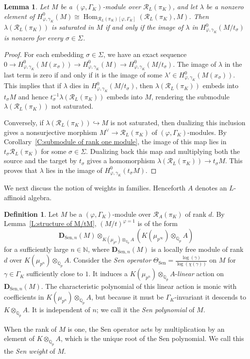 \documentclass[12pt]{article}
\newtheorem{lemma}[theorem]{Lemma}
\theoremstyle{definition}
\newtheorem{defn}[theorem]{Definition}
\numberwithin{equation}{theorem}
\newcommand{\calR}{\mathcal{R}}
\newcommand{\QQ}{\mathbb{Q}}
\newcommand{\NN}{\mathbb{N}}
\newcommand{\bbD}{\mathbf{D}}
\def\Qp{\QQ_p}
\newcommand{\Sen}{\mathrm{Sen}}
\DeclareMathOperator{\Hom}{Hom}
\begin{document}
\begin{lemma}
\label{L:phi Gamma module saturated}
Let $M$ be a $(\varphi, \Gamma_K)$-module over $\calR_L(\pi_K)$, and let $\lambda$ be a nonzero element of $H^0_{\varphi, \gamma_K}(M) \cong \Hom_{\calR_L(\pi_K)[\varphi,\Gamma_K]}(\calR_L(\pi_K),M)$.  Then $\lambda(\calR_L(\pi_K))$ is saturated in $M$ if and only if the image of $\lambda$ in $H^0_{\varphi, \gamma_K}(M/t_\sigma)$ is nonzero for every $\sigma \in \Sigma$.
\end{lemma}
\begin{proof}
For each embedding $\sigma \in \Sigma$, we have an exact sequence $0 \to H^0_{\varphi, \gamma_K}(M(x_\sigma)) \to H^0_{\varphi, \gamma_K}(M) \to H^0_{\varphi, \gamma_K}(M/t_\sigma)$.  
The image of $\lambda$ in the last term is zero if and only if it is the image of some $\lambda' \in H^0_{\varphi, \gamma_K}( M(x_\sigma))$.
This implies that if $\lambda$ dies in $H^0_{\varphi, \gamma_K}(M/t_\sigma)$, then $\lambda(\calR_L(\pi_K))$ embeds into $t_\sigma M$ and hence $t_\sigma^{-1}\lambda(\calR_L(\pi_K))$ embeds into $M$, rendering the submodule $\lambda(\calR_L(\pi_K))$ not saturated.

Conversely, if $\lambda(\calR_L(\pi_K)) \hookrightarrow M$ is not saturated, then dualizing this inclusion gives a nonsurjective morphism $M^\vee \to \calR_L(\pi_K)$ of $(\varphi, \Gamma_K)$-modules.  By Corollary~\ref{C:submodule of rank one module}, the image of this map lies in $t_\sigma\calR_L(\pi_K)$ for some $\sigma \in \Sigma$.  Dualizing back this map and multiplying both the source and the target by $t_\sigma$ gives a homomorphism $\lambda(\calR_L(\pi_K)) \to t_\sigma M$.  This proves that $\lambda$ lies in the image of $H^0_{\varphi, \gamma_K}(t_\sigma M)$.
\end{proof}

We next discuss the notion of weights in families.  Henceforth $A$
denotes an $L$-affinoid algebra.

\begin{defn}
\label{D:generalized Hodge-Tate weights}
Let $M$ be a $(\varphi, \Gamma_K)$-module over $\calR_A(\pi_K)$ of rank $d$.  By Lemma~\ref{L:structure of M/tM}, $(M/t)^{\varphi = 1}$ is of the form
\[
\bbD_{\Sen, n}(M) \otimes_{K(\mu_{p^n}) \otimes_{\Qp} A} (K(\mu_{p^\infty}) \otimes_{\Qp} A)
\]
for a sufficiently large $n \in \NN$, where $\bbD_{\Sen, n}(M)$ is a
locally free module of rank $d$ over $K(\mu_{p^n}) \otimes_{\Qp} A$.
Consider the \emph{Sen operator} $\Theta_\Sen =
\frac{\log(\gamma)}{\log(\chi(\gamma))}$ on $M$ for $\gamma \in
\Gamma_K$ sufficiently close to $1$.  It induces a $K(\mu_{p^n})
\otimes_{\Qp} A$-\emph{linear} action on $\bbD_{\Sen, n}(M)$.  The
characteristic polynomial of this linear action is monic with
coefficients in $K(\mu_{p^n}) \otimes_{\Qp} A$, but because it must be
$\Gamma_K$-invariant it descends to $K \otimes_{\Qp} A$.  It is
independent of $n$; we call it the \emph{Sen polynomial} of $M$.

When the rank of $M$ is one, the Sen operator acts by multiplication by an element of $K\otimes_{\Qp} A$, which is the unique root of the Sen polynomial. We call this the \emph{Sen weight} of $M$.
\end{defn}
\end{document}
